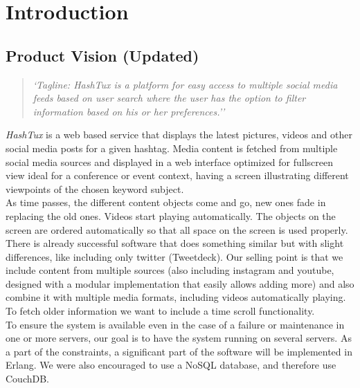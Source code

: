 \chapter{Introduction}

\section{Product Vision (Updated)}
\begin{quote}
\textit{`Tagline: HashTux is a platform for easy access to multiple social
media feeds based on user search where the user has the option to filter
information based on his or her preferences.''}
\end{quote}
{\it HashTux} is a web based service that displays the latest pictures, videos
and other social media posts for a given hashtag. Media content is fetched from
multiple social media sources and displayed in a web interface optimized for
fullscreen view ideal for a conference or event context, having a screen
illustrating different viewpoints of the chosen keyword subject. \\

As time passes, the different content objects come and go, new ones fade in
replacing the old ones. Videos start playing automatically. The objects on the
screen are ordered automatically so that all space on the screen is used
properly. \\

There is already successful software that does something similar but with slight
differences, like including only twitter (Tweetdeck). Our selling point is that
we include content from multiple sources (also including instagram and youtube,
designed with a modular implementation that easily allows adding more) and also
combine it with multiple media formats, including videos automatically playing.
To fetch older information we want to include a time scroll functionality. \\

To ensure the system is available even in the case of a failure or maintenance
in one or more servers, our goal is to have the system running on several
servers. As a part of the constraints, a significant part of the software will
be implemented in Erlang. We were also encouraged to use a NoSQL database, and
therefore use CouchDB. \newpage

